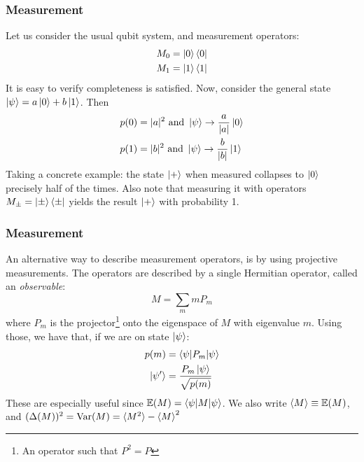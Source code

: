 \documentclass{beamer}
\begin{document}
    \begin{frame}
        \frametitle{Measurement}
        \begin{example}
            Let us consider the usual qubit system, and measurement operators:
            \begin{align}
                M_0 &= \ket{0}\bra{0} \\
                M_1 &= \ket{1}\bra{1} 
            \end{align}
            It is easy to verify completeness is satisfied. Now, consider the general state 
            $\ket{\psi} = a\ket{0} + b\ket{1}$. Then
            \begin{align}
                p(0) &= |a|^2 \text{ and } \ket{\psi} \to \frac{a}{|a|} \ket{0} \\ 
                p(1) &= |b|^2 \text{ and } \ket{\psi} \to \frac{b}{|b|} \ket{1}  
            \end{align}
            Taking a concrete example: the state $\ket{+}$ when measured collapses 
            to $\ket{0}$ precisely half of the times.
            Also note that measuring it with operators $M_{\pm} = \ket{\pm}\bra{\pm}$
            yields the result $\ket{+}$ with probability 1.
        \end{example}
    \end{frame}
    \begin{frame}
        \frametitle{Measurement}
        An alternative way to describe measurement operators, is by using projective measurements.
        The operators are described by a single Hermitian operator, called an \textit{observable}:
        \begin{equation}
            M = \sum_m m P_m
        \end{equation}
        where $P_m$ is the projector\footnote{An operator such that $P^2 = P$ } onto the eigenspace of $M$ with eigenvalue $m$.
        Using those, we have that, if we are on state $\ket{\psi}$:
        \begin{align}
            p(m) &= \braket{\psi|P_m|\psi} \\
            \ket{\psi'} &= \frac{P_m \ket{\psi}}{\sqrt{p(m)}}
        \end{align}
        These are especially useful since $\mathbb{E}(M) = \braket{\psi|M|\psi}$. 
        We also write $\braket{M} \equiv \mathbb{E}(M)$, and $(\Delta(M))^2 = \mathrm{Var}(M) = \braket{M^2} - \braket{M}^2$
    \end{frame}
\end{document}
